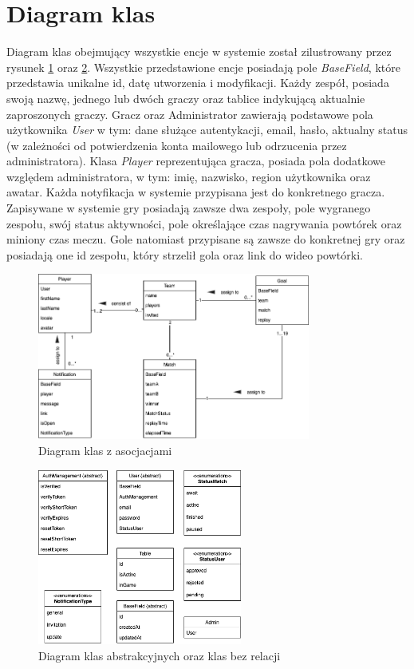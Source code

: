\section{Diagram klas}
Diagram klas obejmujący wszystkie encje w systemie został zilustrowany przez rysunek \ref{fig:ClassDiagram} oraz \ref{fig:AbstractClassDiagram}. Wszystkie przedstawione encje posiadają pole \textit{BaseField}, które przedstawia unikalne id, datę utworzenia i modyfikacji. Każdy zespół, posiada swoją nazwę, jednego lub dwóch graczy oraz tablice indykującą aktualnie zaproszonych graczy. Gracz oraz Administrator zawierają podstawowe pola użytkownika \textit{User} w tym: dane służące autentykacji, email, hasło, aktualny status (w zależności od potwierdzenia konta mailowego lub odrzucenia przez administratora). Klasa \textit{Player} reprezentująca gracza, posiada pola dodatkowe względem administratora, w tym: imię, nazwisko, region użytkownika oraz awatar. Każda notyfikacja w systemie przypisana jest do konkretnego gracza. Zapisywane w systemie gry posiadają zawsze dwa zespoły, pole wygranego zespołu, swój status aktywności, pole określające czas nagrywania powtórek oraz miniony czas meczu. Gole natomiast przypisane są zawsze do konkretnej gry oraz posiadają one id zespołu, który strzelił gola oraz link do wideo powtórki.

\begin{figure}[h!]
    \centering
    \includegraphics[width=0.8\textwidth]{images/diagrams/class_diagram.png}
    \caption{Diagram klas z asocjacjami}
    \label{fig:ClassDiagram}
\end{figure}

\begin{figure}[h!]
    \centering
    \includegraphics[width=0.6\textwidth]{images/diagrams/class_diagram_rest.png}
    \caption{Diagram klas abstrakcyjnych oraz klas bez relacji}
    \label{fig:AbstractClassDiagram}
\end{figure}

